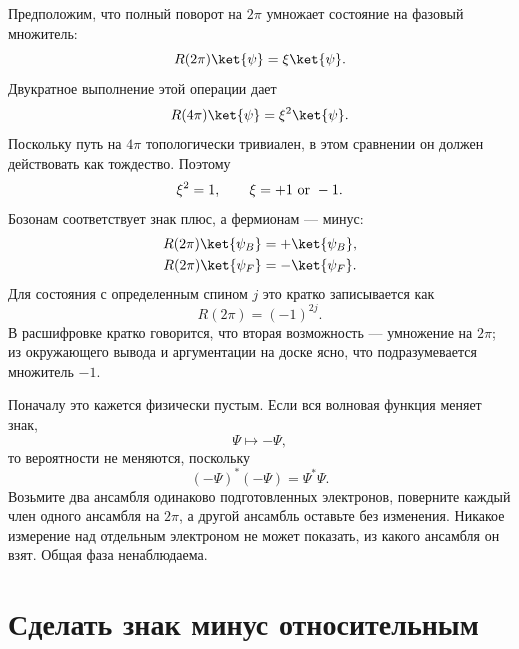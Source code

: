 Предположим, что полный поворот на \(2\pi\) умножает состояние на фазовый множитель:
\begin{equation}
R(2\pi)\ket{\psi}=\xi\ket{\psi}.
\end{equation}
Двукратное выполнение этой операции дает
\begin{equation}
R(4\pi)\ket{\psi}=\xi^2\ket{\psi}.
\end{equation}
Поскольку путь на \(4\pi\) топологически тривиален, в этом сравнении он должен действовать как тождество. Поэтому
\begin{equation}
\xi^2=1,
\qquad
\xi=+1\ \hbox{or}\ -1.
\end{equation}
Бозонам соответствует знак плюс, а фермионам — минус:
\begin{align}
R(2\pi)\ket{\psi_B}&=+\ket{\psi_B},\\
R(2\pi)\ket{\psi_F}&=-\ket{\psi_F}.
\end{align}
Для состояния с определенным спином \(j\) это кратко записывается как
\begin{equation}
R(2\pi)=(-1)^{2j}.
\end{equation}
В расшифровке кратко говорится, что вторая возможность — умножение на \(2\pi\); из окружающего вывода и аргументации на доске ясно, что подразумевается множитель \(-1\).

Поначалу это кажется физически пустым. Если вся волновая функция меняет знак,
\begin{equation}
\Psi\longmapsto-\Psi,
\end{equation}
то вероятности не меняются, поскольку
\begin{equation}
(-\Psi)^*(-\Psi)=\Psi^*\Psi.
\end{equation}
Возьмите два ансамбля одинаково подготовленных электронов, поверните каждый член одного ансамбля на \(2\pi\), а другой ансамбль оставьте без изменения. Никакое измерение над отдельным электроном не может показать, из какого ансамбля он взят. Общая фаза ненаблюдаема.

\section{Сделать знак минус относительным}

